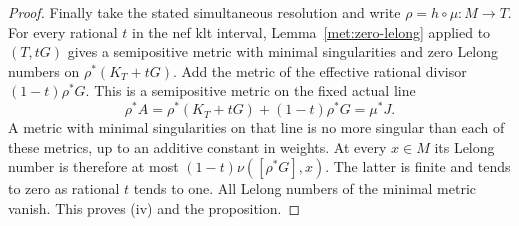 \begin{proof}
Finally take the stated simultaneous resolution and write
$\rho=h\circ\mu:M\to T$.  For every rational $t$ in the nef klt
interval, Lemma~\ref{met:zero-lelong} applied to
$(T,tG)$ gives a semipositive metric with minimal singularities
and zero Lelong numbers on $\rho^*(K_T+tG)$.  Add the metric of
the effective rational divisor $(1-t)\rho^*G$.  This is a
semipositive metric on the fixed actual line
\begin{equation}
 \rho^*A=\rho^*(K_T+tG)+(1-t)\rho^*G=\mu^*J.
 \label{bir:metric-interval}
\end{equation}
A metric with minimal singularities on that line is no more
singular than each of these metrics, up to an additive constant
in weights.  At every $x\in M$ its Lelong number is therefore at
most $(1-t)\nu([\rho^*G],x)$.  The latter is finite and tends to
zero as rational $t$ tends to one.  All Lelong numbers of the
minimal metric vanish.  This proves (iv) and the proposition.
\end{proof}
